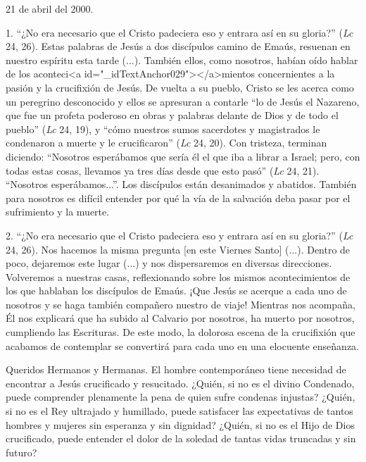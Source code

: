 			\begin{referencia}21 de abril del 2000.\end{referencia}
			
			\begin{body} 1. “¿No era necesario que el Cristo padeciera eso y entrara así en su gloria?” (\textit{Lc} 24, 26). Estas palabras de Jesús a dos discípulos camino de Emaús, resuenan en nuestro espíritu esta tarde (...). También ellos, como nosotros, habían oído hablar de los aconteci<a id="_idTextAnchor029"></a>mientos concernientes a la pasión y la crucifixión de Jesús. De vuelta a su pueblo, Cristo se les acerca como un peregrino desconocido y ellos se apresuran a contarle “lo de Jesús el Nazareno, que fue un profeta poderoso en obras y palabras delante de Dios y de todo el pueblo” (\textit{Lc} 24, 19), y “cómo nuestros sumos sacerdotes y magistrados le condenaron a muerte y le crucificaron” (\textit{Lc} 24, 20). Con tristeza, terminan diciendo: “Nosotros esperábamos que sería él el que iba a librar a Israel; pero, con todas estas cosas, llevamos ya tres días desde que esto pasó” (\textit{Lc }24, 21). “Nosotros esperábamos...”. Los discípulos están desanimados y abatidos. También para nosotros es difícil entender por qué la vía de la salvación deba pasar por el sufrimiento y la muerte.\end{body}
			
			\begin{body}2. “¿No era necesario que el Cristo padeciera eso y entrara así en su gloria?” (\textit{Lc} 24, 26). Nos hacemos la misma pregunta [en este Viernes Santo] (...). Dentro de poco, dejaremos este lugar (...) y nos dispersaremos en diversas direcciones. Volveremos a nuestras casas, reflexionando sobre los mismos acontecimientos de los que hablaban los discípulos de Emaús. ¡Que Jesús se acerque a cada uno de nosotros y se haga también compañero nuestro de viaje! Mientras nos acompaña, Él nos explicará que ha subido al Calvario por nosotros, ha muerto por nosotros, cumpliendo las Escrituras. De este modo, la dolorosa escena de la crucifixión que acabamos de contemplar se convertirá para cada uno en una elocuente enseñanza.\end{body}
			
			\begin{body}Queridos Hermanos y Hermanas. El hombre contemporáneo tiene necesidad de encontrar a Jesús crucificado y resucitado. ¿Quién, si no es el divino Condenado, puede comprender plenamente la pena de quien sufre condenas injustas? ¿Quién, si no es el Rey ultrajado y humillado, puede satisfacer las expectativas de tantos hombres y mujeres sin esperanza y sin dignidad? ¿Quién, si no es el Hijo de Dios crucificado, puede entender el dolor de la soledad de tantas vidas truncadas y sin futuro?\end{body}
			
